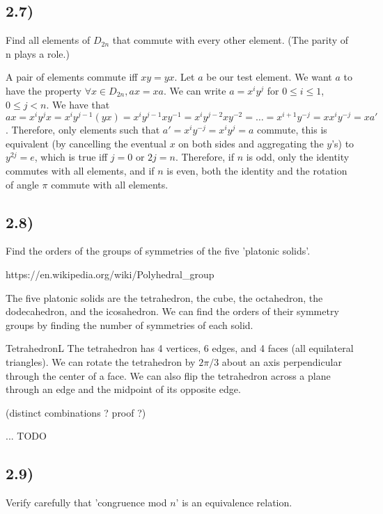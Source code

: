 \documentclass[12pt, letterpaper, twoside]{report}
\begin{document}
\subsection*{2.7)}

Find all elements of $D_{2n}$ that commute with every other element. (The parity of n plays a role.)

A pair of elements commute iff $xy = yx$. Let $a$ be our test element. We want $a$ to have the property $\forall x \in D_{2n}, ax = xa$. We can write $a = x^i y^j$ for $0 \leq i \leq 1$, $0 \leq j < n$. We have that $ax = x^i y^j x = x^i y^{j-1}(yx) = x^i y^{j-1} x y^{-1} = x^i y^{j-2} x y^{-2} = \ldots = x^{i+1} y^{-j} = x x^i y^{-j} = xa'$. Therefore, only elements such that $a' = x^i y^{-j} = x^i y^j = a$ commute, this is equivalent (by cancelling the eventual $x$ on both sides and aggregating the $y$'s) to $y^{2j} = e$, which is true iff $j = 0$ or $2j = n$. Therefore, if $n$ is odd, only the identity commutes with all elements, and if $n$ is even, both the identity and the rotation of angle $\pi$ commute with all elements.


\subsection*{2.8)}

Find the orders of the groups of symmetries of the five 'platonic solids'.

https://en.wikipedia.org/wiki/Polyhedral\_group

The five platonic solids are the tetrahedron, the cube, the octahedron, the dodecahedron, and the icosahedron. We can find the orders of their symmetry groups by finding the number of symmetries of each solid.

TetrahedronL The tetrahedron has 4 vertices, 6 edges, and 4 faces (all equilateral triangles). We can rotate the tetrahedron by $2\pi/3$ about an axis perpendicular through the center of a face. We can also flip the tetrahedron across a plane through an edge and the midpoint of its opposite edge.

(distinct combinations ? proof ?)

... TODO


\subsection*{2.9)}

Verify carefully that 'congruence mod $n$' is an equivalence relation.
\end{document}
